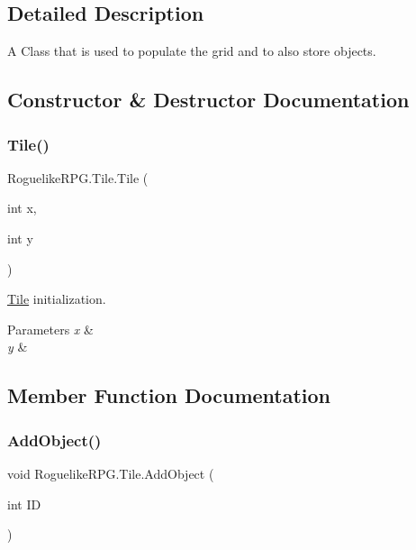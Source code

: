 \subsection{Detailed Description}
A Class that is used to populate the grid and to also store objects. 



\subsection{Constructor \& Destructor Documentation}
\mbox{\label{class_roguelike_r_p_g_1_1_tile_ac00f81529ef711a7875d3810749a729d}} 
\subsubsection{\texorpdfstring{Tile()}{Tile()}}
{\footnotesize\ttfamily Roguelike\+R\+P\+G.\+Tile.\+Tile (\begin{DoxyParamCaption}\item[{int}]{x,  }\item[{int}]{y }\end{DoxyParamCaption})\hspace{0.3cm}{\ttfamily [inline]}}



\mbox{\hyperlink{class_roguelike_r_p_g_1_1_tile}{Tile}} initialization. 


\begin{DoxyParams}{Parameters}
{\em x} & \\
\hline
{\em y} & \\
\hline
\end{DoxyParams}


\subsection{Member Function Documentation}
\mbox{\label{class_roguelike_r_p_g_1_1_tile_a4540cd9d2fb8989e65778bcffbbe340f}} 
\subsubsection{\texorpdfstring{Add\+Object()}{AddObject()}}
{\footnotesize\ttfamily void Roguelike\+R\+P\+G.\+Tile.\+Add\+Object (\begin{DoxyParamCaption}\item[{int}]{ID }\end{DoxyParamCaption})\hspace{0.3cm}{\ttfamily [inline]}}



